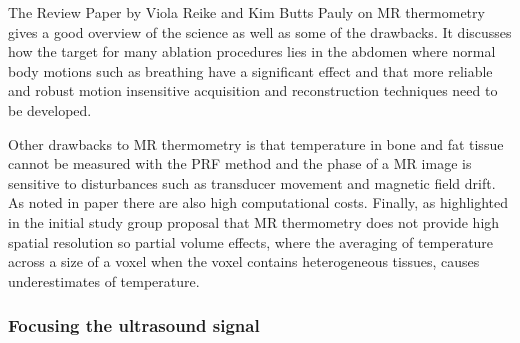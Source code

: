 \documentclass[11pt]{article} %
\begin{document}
	The Review Paper by Viola Reike and Kim Butts Pauly on MR thermometry \cite{Rieke2008} gives a good overview of the science as well as some of the drawbacks.  	It discusses how the target for many ablation procedures lies in the abdomen where normal body motions such as breathing have a significant effect and that more reliable and robust motion insensitive acquisition and reconstruction techniques need to be developed.
	 
	Other drawbacks to MR thermometry is that temperature in bone and fat tissue cannot be measured with the PRF method and the phase of a MR image is sensitive to disturbances such as transducer movement and magnetic field drift. As noted in paper \cite{Hosseini2018} there are also high computational costs. Finally, as highlighted in the initial study group proposal that MR thermometry does not provide high spatial resolution so partial volume effects, where the averaging of temperature across a size of a voxel when the voxel contains heterogeneous tissues, causes underestimates of temperature. 
	
	
	

	
	\subsubsection{Focusing the ultrasound signal}
	
\end{document}
